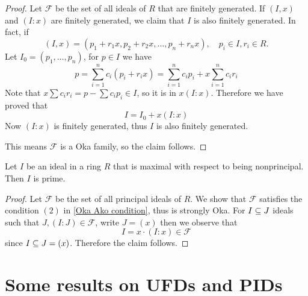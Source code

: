 \begin{proof}
Let $\mathcal{F}$ be the set of all ideals of $R$ that are finitely generated. If $(I,x)$ and $(I:x)$ are finitely generated, we claim that $I$ is also finitely generated. In fact, if 
\[(I,x)=(p_1+r_1x,p_2+r_2x,\dots,p_n+r_nx),\quad p_i\in I,r_i\in R.\]
Let $I_0=(p_1,\dots,p_n)$, for $p\in I$ we have
\[p=\sum_{i=1}^{n}c_i(p_i+r_ix)=\sum_{i=1}^{n}c_ip_i+x\sum_{i=1}^{n}c_ir_i\]
Note that $x\sum c_ir_i=p-\sum c_ip_i\in I$, so it is in $x(I:x)$. Therefore we have proved that
\[I=I_0+x(I:x)\]
Now $(I:x)$ is finitely generated, thus $I$ is also finitely generated.\par
This means $\mathcal{F}$ is a Oka family, so the claim follows.
\end{proof}
\begin{theorem}\label{prime nonprincipal}
Let $I$ be an ideal in a ring $R$ that is maximal with respect to being nonprincipal. Then $I$ is prime.
\end{theorem}
\begin{proof}
Let $\mathcal{F}$ be the set of all principal ideals of $R$. We show that $\mathcal{F}$ satisfies the condition $(2)$ in \cref{Oka Ako condition}, thus is strongly Oka. For $I\subseteq J$ ideals such that $J,(I:J)\in\mathcal{F}$, write $J=(x)$ then we observe that
\[I=x\cdot(I:x)\in\mathcal{F}\]
since $I\subseteq J=(x)$. Therefore the claim follows.
\end{proof}
\section{Some results on UFDs and PIDs}
